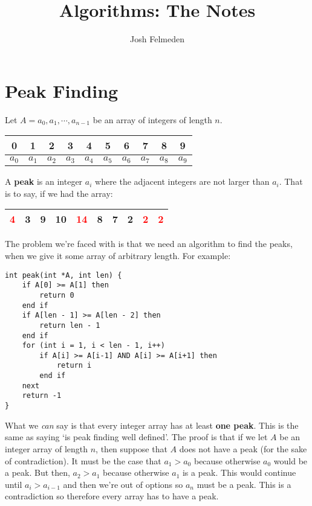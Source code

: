 \documentclass[11pt,a4paper,titlepage,dvipsnames,cmyk]{scrartcl}
\title{Algorithms: The Notes}
\author{Josh Felmeden}
\begin{document}
\maketitle

\tableofcontents
\newpage
{}

\section{Peak Finding}%
\label{sec:peak-finding}
Let $A = a_0, a_1, \cdots, a_{n-1}$ be an array of integers of length $n$.
\begin{center}
    \begin{tabular}{|c|c|c|c|c|c|c|c|c|c|}
        \hline
        0 & 1 & 2 & 3 & 4 & 5 & 6 & 7 & 8 & 9 \\
        \hline
        $a_0$ &$a_1$ & $a_2$ &$a_3$ &$a_4$ &$a_5$ &$a_6$ &$a_7$ &$a_8$
              &$a_9$  \\
              \hline
    \end{tabular}
\end{center}

A \textbf{peak} is an integer $a_i$ where the adjacent integers are not
larger than $a_i$. That is to say, if we had the array:

\begin{center}
    \begin{tabular}{|c|c|c|c|c|c|c|c|c|c|}
        \hline
        \textcolor{red}{4} & 3 & 9 & 10 & \textcolor{red}{14} & 8 & 7 & 2
                           & \textcolor{red}{2} & \textcolor{red}{2} \\
        \hline
    \end{tabular}
\end{center}

The problem we're faced with is that we need an algorithm to find the
peaks, when we give it some array of arbitrary length. For example:

\begin{lstlisting}
int peak(int *A, int len) {
    if A[0] >= A[1] then
        return 0
    end if
    if A[len - 1] >= A[len - 2] then
        return len - 1
    end if
    for (int i = 1, i < len - 1, i++)
        if A[i] >= A[i-1] AND A[i] >= A[i+1] then
            return i
        end if
    next
    return -1
}
\end{lstlisting}

What we \textit{can} say is that every integer array has at least
\textbf{one peak}. This is the same as saying `is peak finding well
defined'. The proof is that if we let $A$ be an integer array of length
$n$, then suppose that $A$ does not have a peak (for the sake of
contradiction). It must be the case that $a_1 > a_0$ because otherwise
$a_0$ would be a peak. But then, $a_2 > a_1$ because otherwise $a_1$ is a
peak. This would continue until $a_i > a_{i-1}$ and then we're out of
options so $a_n$ must be a peak. This is a contradiction so therefore
every array has to have a peak.
\end{document}
